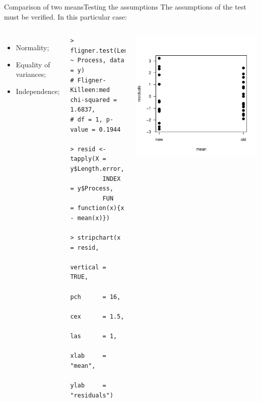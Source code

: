 \begin{frame}[fragile]{Comparison of two means}{Testing the assumptions}
The assumptions of the test must be verified. In this particular case:

\begin{columns}[T]
  {\smaller
    \begin{itemize}
      \item Normality;
      \item \alert{Equality of variances};
      \item Independence;
    \end{itemize}
    {\smaller
\begin{verbatim}
> fligner.test(Length.error ~ Process, data = y)
# Fligner-Killeen:med chi-squared = 1.6837,
# df = 1, p-value = 0.1944

> resid <- tapply(X = y$Length.error,
         INDEX = y$Process,
         FUN   = function(x){x - mean(x)})

> stripchart(x        = resid,
             vertical = TRUE,
             pch      = 16,
             cex      = 1.5,
             las      = 1,
             xlab     = "mean",
             ylab     = "residuals")
\end{verbatim}}}
\includegraphics[width=\textwidth]{../img/steelrodsvar.pdf}
\end{columns}
\end{frame}

